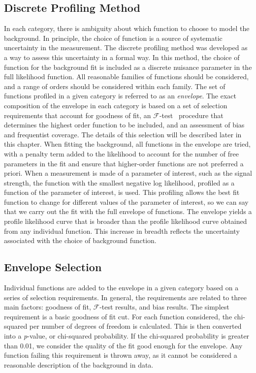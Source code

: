 \subsection{Discrete Profiling Method}\label{sec:envelope}
In each category, there is ambiguity about which function to choose to model the background. 
In principle, the choice of function is a source of systematic uncertainty in the measurement. 
The discrete profiling method was developed as a way to assess this uncertainty in a formal way. 
In this method, the choice of function for the background fit is included as a 
discrete nuisance parameter in the full likelihood function. All reasonable families of 
functions should be considered, and a range of orders should be considered within each family. 
The set of functions profiled in a given category is referred to as an \textit{envelope}.
The exact composition of the envelope in each category
is based on a set of selection requirements that account for goodness of fit, an $\mathcal{F}$-test~\cite{Fisher:1922saa} procedure that determines the highest order function to be included, 
and an assessment of bias and frequentist coverage. The details of this selection will be described later in this chapter.
When fitting the background, all functions in the envelope are tried, with a penalty term added to the likelihood 
to account for the number of free parameters in the fit and ensure that higher-order functions are not preferred a priori. When a measurement is made of 
a parameter of interest, such as the signal strength, the function with the smallest negative log likelihood, 
profiled as a function of the parameter of interest, is used. This profiling allows the best fit function to change for 
different values of the parameter of interest, so we can say that we carry out the fit with the full envelope of functions.  
The envelope yields a profile likelihood curve that is broader than the profile likelihood curve obtained from any individual function. 
This increase in breadth reflects the uncertainty associated with the choice of background function. 

\subsection{Envelope Selection}\label{sec:envelope_selection}
Individual functions are added to the envelope in a given category based on a series of selection requirements. In general, 
the requirements are related to three main factors: goodness of fit, $\mathcal{F}$-test results, and bias results. 
The simplest requirement is a basic goodness of fit cut. For each function considered, the chi-squared per number of degrees of freedom is calculated. This is 
then converted into a \textit{p}-value, or chi-squared probability. If the chi-squared probability is greater than 0.01, we consider 
the quality of the fit good enough for the envelope. Any function failing this requirement is thrown away, as it cannot
be considered a reasonable description of the background in data. 

